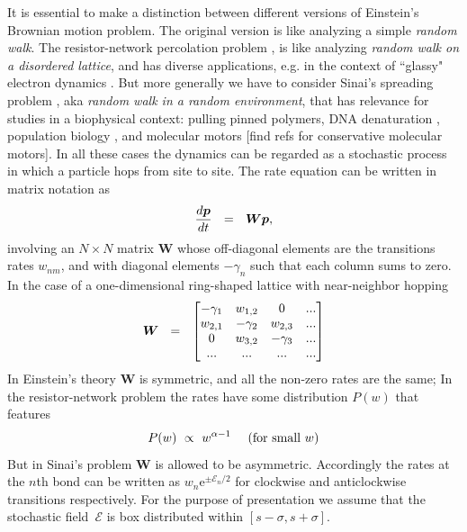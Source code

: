 \documentclass[aps,pre,floats,floatfix,twocolumn]{revtex4}
\newcommand{\amatrix}[1]{\begin{matrix} #1 \end{matrix}}
\newcommand{\eexp}[1]{\mathrm{e}^{#1}}
\newcommand{\be}[1]{\begin{eqnarray}\ifthenelse{#1=-1}{\nonumber}{\ifthenelse{#1=0}{}{\label{e#1}}}}
\newcommand{\eeq}{\end{eqnarray}}
\newcommand{\rmrk}[1]{{\color[rgb]{0.6,0,0.1} #1}}
\begin{document}
It is essential to make a distinction between different versions of Einstein's Brownian motion 
problem. The original version is like analyzing a simple {\em random walk}.    
The resistor-network percolation problem \cite{Alexander}, 
is like analyzing {\em random walk on a disordered lattice}, 
and has diverse applications, e.g. in the context of ``glassy" electron dynamics \cite{ege,egt}. 
But more generally we have to consider Sinai's spreading problem \cite{Sinai,odh1,odh3,BouchaudReview}, 
aka {\em random walk in a random environment}, that has relevance 
for studies in a biophysical context: 
pulling pinned polymers, DNA denaturation \cite{DNA1, DNA2}, 
population biology \cite{popbio,popbio2}, 
and molecular motors \rmrk{[find refs for conservative molecular motors]}. 
%
In all these cases the dynamics can be regarded as a stochastic process 
in which a particle hops from site to site.
The rate equation can be written in matrix notation as 
%
\be{1}
\frac{d\bm{p}}{dt} \ \ = \ \ \bm{W} \bm{p}, 
\eeq
%
involving an $N\times N$ matrix ${\bm{W}}$ whose off-diagonal elements 
are the transitions rates ${w_{nm}}$, 
and with diagonal elements ${-\gamma_n}$ such that each column sums to zero. 
In the case of a one-dimensional ring-shaped lattice with near-neighbor hopping
%
\be{2}
\bm{W} \ \ = \ \ \left[\amatrix{
-\gamma_1   & w_{1,2}   & 0         & ... \\ 
w_{2,1}     & -\gamma_2 & w_{2,3}   & ... \\ 
0           & w_{3,2}   & -\gamma_3 & ... \\
...         & ...       & ...       & ...
}\right]
\eeq 
%
In Einstein's theory $\bm{W}$ is symmetric, 
and all the non-zero rates are the same; 
In the resistor-network problem the rates
have some distribution $P(w)$ that features 
%
\be{4}
P(w) \ \propto \ w^{\alpha-1} \ \ \ \ \text{(for small $w$)}
\eeq
%
But in Sinai's problem $\bm{W}$ is allowed to be asymmetric.
Accordingly the rates at the $n$th bond can be written 
as $w_n\eexp{\pm\mathcal{E}_n/2}$ 
for clockwise and anticlockwise transitions respectively. 
For the purpose of presentation we assume that the stochastic field~$\mathcal{E}$  
is box distributed within ${[s-\sigma,s+\sigma]}$. 
\end{document}
